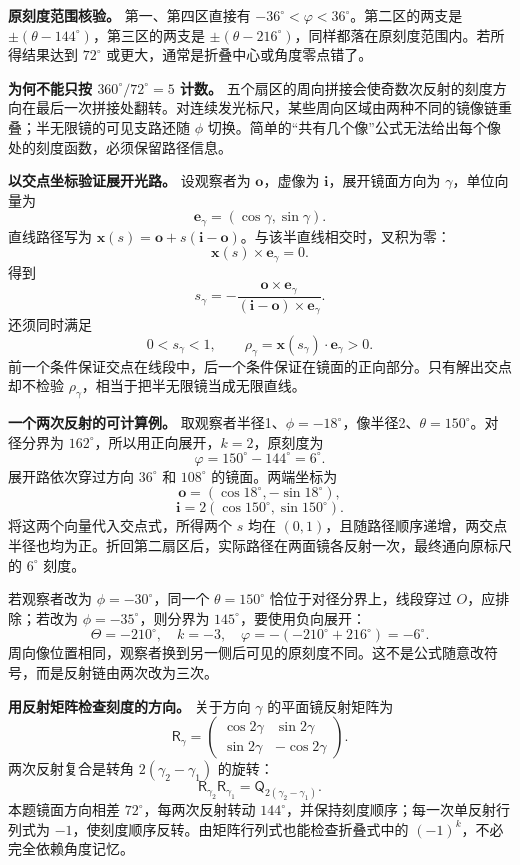 \documentclass[12pt,a4paper,UTF8]{ctexart}
\begin{document}
\textbf{原刻度范围核验。} 第一、第四区直接有
\(-36^\circ<\varphi<36^\circ\)。第二区的两支是
\(\pm(\theta-144^\circ)\)，第三区的两支是
\(\pm(\theta-216^\circ)\)，同样都落在原刻度范围内。若所得结果达到
\(72^\circ\) 或更大，通常是折叠中心或角度零点错了。

\textbf{为何不能只按 \(360^\circ/72^\circ=5\) 计数。}
五个扇区的周向拼接会使奇数次反射的刻度方向在最后一次拼接处翻转。对连续发光标尺，某些周向区域由两种不同的镜像链重叠；半无限镜的可见支路还随
\(\phi\)
切换。简单的``共有几个像''公式无法给出每个像处的刻度函数，必须保留路径信息。

\textbf{以交点坐标验证展开光路。} 设观察者为 \(\boldsymbol o\)，虚像为
\(\boldsymbol i\)，展开镜面方向为 \(\gamma\)，单位向量为 \[
\boldsymbol e_\gamma=(\cos\gamma,\sin\gamma).
\] 直线路径写为
\(\boldsymbol x(s)=\boldsymbol o+s(\boldsymbol i-\boldsymbol o)\)。与该半直线相交时，叉积为零：
\[
\boldsymbol x(s)\times\boldsymbol e_\gamma=0.
\] 得到 \[
s_\gamma=
-\frac{\boldsymbol o\times\boldsymbol e_\gamma}
{(\boldsymbol i-\boldsymbol o)\times\boldsymbol e_\gamma}.
\] 还须同时满足 \[
0<s_\gamma<1,\qquad
\rho_\gamma=\boldsymbol x(s_\gamma)\cdot\boldsymbol e_\gamma>0.
\]
前一个条件保证交点在线段中，后一个条件保证在镜面的正向部分。只有解出交点却不检验
\(\rho_\gamma\)，相当于把半无限镜当成无限直线。

\textbf{一个两次反射的可计算例。}
取观察者半径1、\(\phi=-18^\circ\)，像半径2、\(\theta=150^\circ\)。对径分界为
\(162^\circ\)，所以用正向展开，\(k=2\)，原刻度为 \[
\varphi=150^\circ-144^\circ=6^\circ.
\] 展开路依次穿过方向 \(36^\circ\) 和 \(108^\circ\) 的镜面。两端坐标为
\[
\boldsymbol o=(\cos18^\circ,-\sin18^\circ),
\] \[
\boldsymbol i=2(\cos150^\circ,\sin150^\circ).
\] 将这两个向量代入交点式，所得两个 \(s\) 均在
\((0,1)\)，且随路径顺序递增，两交点半径也均为正。折回第二扇区后，实际路径在两面镜各反射一次，最终通向原标尺的
\(6^\circ\) 刻度。

若观察者改为 \(\phi=-30^\circ\)，同一个 \(\theta=150^\circ\)
恰位于对径分界上，线段穿过 \(O\)，应排除；若改为
\(\phi=-35^\circ\)，则分界为 \(145^\circ\)，要使用负向展开： \[
\Theta=-210^\circ,\quad k=-3,\quad
\varphi=-(-210^\circ+216^\circ)=-6^\circ.
\]
周向像位置相同，观察者换到另一侧后可见的原刻度不同。这不是公式随意改符号，而是反射链由两次改为三次。

\textbf{用反射矩阵检查刻度的方向。} 关于方向 \(\gamma\)
的平面镜反射矩阵为 \[
\mathsf R_\gamma=
\begin{pmatrix}
\cos2\gamma&\sin2\gamma\\
\sin2\gamma&-\cos2\gamma
\end{pmatrix}.
\] 两次反射复合是转角 \(2(\gamma_2-\gamma_1)\) 的旋转： \[
\mathsf R_{\gamma_2}\mathsf R_{\gamma_1}
=\mathsf Q_{2(\gamma_2-\gamma_1)}.
\] 本题镜面方向相差 \(72^\circ\)，每两次反射转动
\(144^\circ\)，并保持刻度顺序；每一次单反射行列式为
\(-1\)，使刻度顺序反转。由矩阵行列式也能检查折叠式中的
\((-1)^k\)，不必完全依赖角度记忆。
\end{document}
